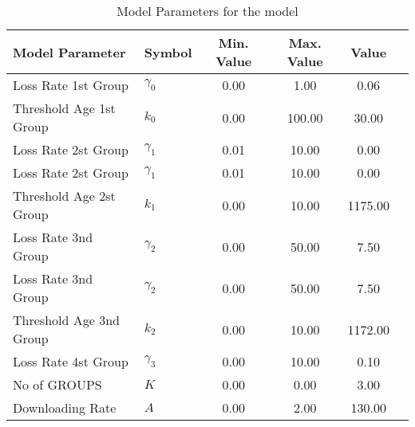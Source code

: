 \begin{table}
\centering
\begin{tabular}{p{5cm}lcccc}
{\bf Model Parameter} & {\bf Symbol} & {\bf Min. Value} & {\bf Max. Value} & {\bf Value}\\
\hline\hline
Loss Rate 1st Group & $\gamma_0$ & 0.00 & 1.00 & 0.06\\
Threshold Age 1st Group & $k_0$ & 0.00 & 100.00 & 30.00\\
Loss Rate 2st Group & $\gamma_1$ & 0.01 & 10.00 & 0.00\\
Loss Rate 2st Group & $\gamma_1$ & 0.01 & 10.00 & 0.00\\
Threshold Age 2st Group & $k_1$ & 0.00 & 10.00 & 1175.00\\
Loss Rate 3nd Group & $\gamma_2$ & 0.00 & 50.00 & 7.50\\
Loss Rate 3nd Group & $\gamma_2$ & 0.00 & 50.00 & 7.50\\
Threshold Age 3nd Group & $k_2$ & 0.00 & 10.00 & 1172.00\\
Loss Rate 4st Group & $\gamma_3$ & 0.00 & 10.00 & 0.10\\
No of GROUPS & $K$ & 0.00 & 0.00 & 3.00\\
Downloading Rate & $A$ & 0.00 & 2.00 & 130.00\\
\hline\hline
\end{tabular}
\caption{Model Parameters for the model}
\end{table}
